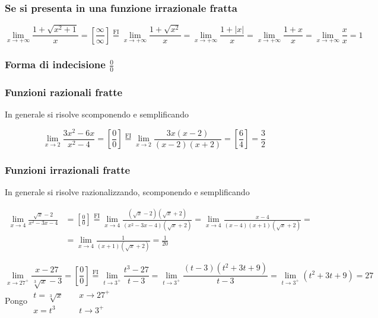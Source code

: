\documentclass{book}     %
\begin{document}
\subsubsection{Se si presenta in una funzione irrazionale fratta}
\begin{ex}
\[\lim_{x\to +\infty}\frac{1+\sqrt{x^2+1}}{x}=\left[\frac{\infty}{\infty}\right]\overset{\mathrm{FI}}{=}\lim_{x\to +\infty}\frac{1+\sqrt{x^2}}{x}=\lim_{x\to +\infty}\frac{1+|x|}{x}=\lim_{x\to +\infty}\frac{1+x}{x}=\lim_{x\to +\infty}\frac{x}{x}= 1\]
\end{ex}
\subsubsection{Forma di indecisione $\frac{0}{0}$}
\subsubsection{Funzioni razionali fratte}
In generale si risolve scomponendo e semplificando
\begin{ex}
\[\lim_{x\to 2} \frac{3x^2-6x}{x^2-4}= \left[\frac{0}{0}\right]\overset{\mathrm{FI}}{=}\lim_{x\to 2}\frac{3x(x-2)}{(x-2)(x+2)}=\left[\frac{6}{4}\right]=\frac{3}{2}\]
\end{ex}
\subsubsection{Funzioni irrazionali fratte}
In generale si risolve razionalizzando, scomponendo e semplificando
\begin{ex}
\[\begin{aligned}\lim_{x\to 4}\frac{\sqrt{x}-2}{x^2-3x-4}&= \left[\frac{0}{0}\right]\overset{\mathrm{FI}}{=}\lim_{x\to 4}\frac{(\sqrt{x}-2)(\sqrt{x}+2)}{(x^2-3x-4)(\sqrt{x}+2)}=\lim_{x\to 4}\frac{x-4}{(x-4)(x+1)(\sqrt{x}+2)} =\\&=\lim_{x\to 4}\frac{1}{(x+1)(\sqrt{x}+2)}=\frac{1}{20}\end{aligned}\]
\end{ex}
\begin{ex}
\[\lim_{x\to27^+}\frac{x-27}{\sqrt[3]{x}-3}=\left[\frac{0}{0}\right]\overset{\mathrm{FI}}{=}\lim_{t\to3^+}\frac{t^3-27}{t-3}=\lim_{t\to3^+}\frac{(t-3)(t^2+3t+9)}{t-3}=\lim_{t\to3^+}(t^2+3t+9)=27\]
Pongo $\begin{array}{ll}
    t=\sqrt[3]{x}~~~~~ &  x\to27^+\\
    x=t^3 & t\to 3^+
\end{array}$
\end{ex}
\end{document}
